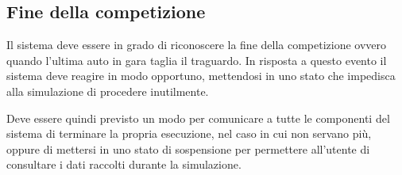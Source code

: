 \subsection*{Fine della competizione}
Il sistema deve essere in grado di riconoscere la fine della competizione ovvero quando l'ultima auto in gara taglia il traguardo. In risposta a questo evento il sistema deve reagire in modo opportuno, mettendosi in uno stato che impedisca alla simulazione di procedere inutilmente.

Deve essere quindi previsto un modo per comunicare a tutte le componenti del sistema di terminare la propria esecuzione, nel caso in cui non servano più, oppure di mettersi in uno stato di sospensione per permettere all'utente di consultare i dati raccolti durante la simulazione.
 
